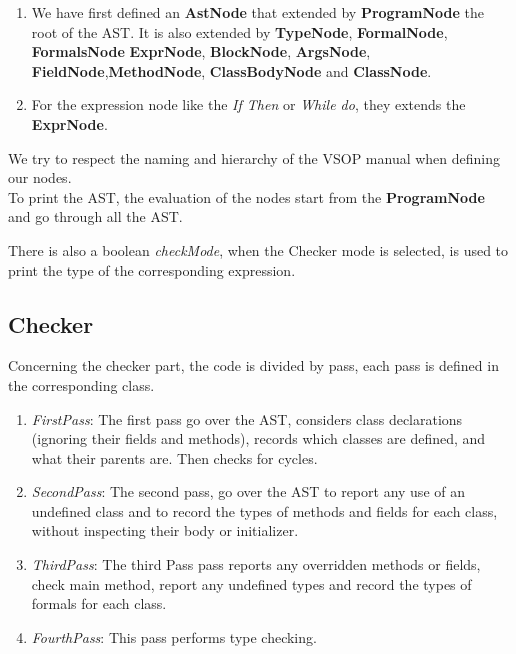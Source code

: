 \documentclass[11pt]{article}
\begin{document}
\begin{enumerate}
    \item We have first defined an \textbf{AstNode} that extended by \textbf{ProgramNode} the root of the AST. It is also extended by 
    \textbf{TypeNode}, \textbf{FormalNode}, \textbf{FormalsNode} \textbf{ExprNode}, \textbf{BlockNode}, \textbf{ArgsNode}, \textbf{FieldNode},\textbf{MethodNode}, \textbf{ClassBodyNode} and \textbf{ClassNode}.
    \item For the expression node like the \textit{If Then} or \textit{While do}, they extends the \textbf{ExprNode}.
\end{enumerate}
We try to respect the naming and hierarchy of the VSOP manual when defining our nodes.\\

To print the AST, the evaluation of the nodes start from the \textbf{ProgramNode} and go through all the AST.\\

\par There is also a boolean \textit{checkMode}, when the Checker mode is selected, is used to print the type of the corresponding expression.


\subsection{Checker}

Concerning the checker part, the code is divided by pass, each pass is defined in the corresponding class.

\begin{enumerate}
    \item \textit{FirstPass}: The first pass go over the AST, considers class declarations (ignoring their fields and methods), records which classes are defined, and what their parents are. Then checks for cycles.
    \item \textit{SecondPass}: The second pass, go over the AST to report any use of an undefined class and to record the types of methods and fields for each class, without inspecting their body or initializer.
    \item \textit{ThirdPass}: The third Pass pass reports any overridden methods or fields, check main method, report any undefined types and record the types of formals for each class.
    \item \textit{FourthPass}: This pass performs type checking.
\end{enumerate}
\end{document}
